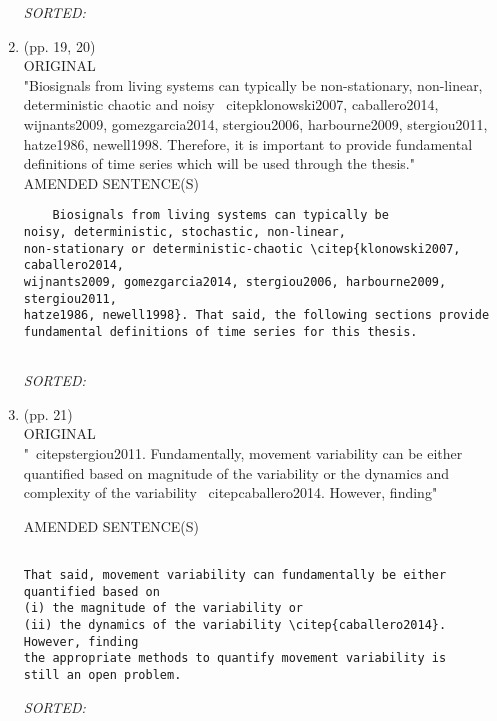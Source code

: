 \documentclass[12pt]{article}
\begin{document}
\begin{enumerate}
\begin{verbatim}
	\end{verbatim}
	\textit{
	SORTED:  
	}
	\\



\item  (pp. 19, 20)  \\ 

	ORIGINAL \\
"Biosignals from living systems can typically be non-stationary, non-linear, 
deterministic chaotic and noisy \ citep{klonowski2007, caballero2014, 
wijnants2009, gomezgarcia2014, stergiou2006, harbourne2009, stergiou2011,
hatze1986, newell1998}. Therefore, it is important to provide fundamental 
definitions of time series which will be used through the thesis." \\

AMENDED SENTENCE(S) \\
	\begin{verbatim}
	Biosignals from living systems can typically be 
noisy, deterministic, stochastic, non-linear, 
non-stationary or deterministic-chaotic \citep{klonowski2007, caballero2014, 
wijnants2009, gomezgarcia2014, stergiou2006, harbourne2009, stergiou2011,
hatze1986, newell1998}. That said, the following sections provide 
fundamental definitions of time series for this thesis.


	\end{verbatim}
	\textit{
	SORTED:  
	}
	\\




\item  (pp. 21)  \\
ORIGINAL \\
"\ citep{stergiou2011}. Fundamentally, movement variability can be either 
quantified based on magnitude of the variability or the dynamics and 
complexity of the variability \ citep{caballero2014}. However, finding"

AMENDED SENTENCE(S) \\
	\begin{verbatim}

That said, movement variability can fundamentally be either 
quantified based on 
(i) the magnitude of the variability or 
(ii) the dynamics of the variability \citep{caballero2014}. 
However, finding 
the appropriate methods to quantify movement variability is 
still an open problem. 

	\end{verbatim}
	\textit{
	SORTED:  
	}
	\\












\end{enumerate}
\end{document}
